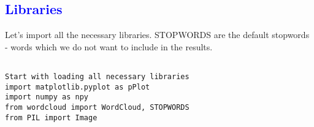 \documentclass[11pt]{report}
\begin{document}
\textcolor{blue}{\section{Libraries}}

Let's import all the necessary libraries. STOPWORDS are the default stopwords - words which we do not want to include in the results.

\begin{lstlisting}

Start with loading all necessary libraries
import matplotlib.pyplot as pPlot
import numpy as npy
from wordcloud import WordCloud, STOPWORDS
from PIL import Image
\end{lstlisting}
\end{document}
